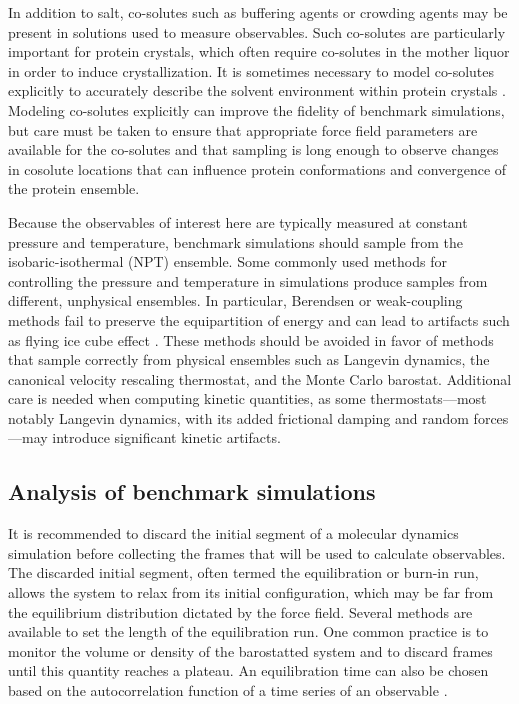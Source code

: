 \documentclass[9pt,review]{livecoms}
\begin{document}
In addition to salt, co-solutes such as buffering agents or crowding agents may be present in solutions used to measure observables.
Such co-solutes are particularly important for protein crystals, which often require co-solutes in the mother liquor in order to induce crystallization.
It is sometimes necessary to model co-solutes explicitly to accurately describe the solvent environment within protein crystals \cite{wall_biomolecular_2019}.
Modeling co-solutes explicitly can improve the fidelity of benchmark simulations, but care must be taken to ensure that appropriate force field parameters are available for the co-solutes and that sampling is long enough to observe changes in cosolute locations that can influence protein conformations and convergence of the protein ensemble.

Because the observables of interest here are typically measured at constant pressure and temperature, benchmark simulations should sample from the isobaric-isothermal (NPT) ensemble.
Some commonly used methods for controlling the pressure and temperature in simulations produce samples from different, unphysical ensembles.
In particular, Berendsen or weak-coupling methods fail to preserve the equipartition of energy and can lead to artifacts such as flying ice cube effect \cite{harvey_flying_1998,braun_anomalous_2018}.
These methods should be avoided in favor of methods that sample correctly from physical ensembles such as Langevin dynamics, the canonical velocity rescaling thermostat, and the Monte Carlo barostat.
Additional care is needed when computing kinetic quantities, as some thermostats---most notably Langevin dynamics, with its added frictional damping and random forces---may introduce significant kinetic artifacts.

\subsection{Analysis of benchmark simulations}
\label{sub:best_practices_analysis}

It is recommended to discard the initial segment of a molecular dynamics simulation before collecting the frames that will be used to calculate observables.
The discarded initial segment, often termed the equilibration or burn-in run, allows the system to relax from its initial configuration, which may be far from the equilibrium distribution dictated by the force field.
Several methods are available to set the length of the equilibration run. 
One common practice is to monitor the volume or density of the barostatted system and to discard frames until this quantity reaches a plateau.
An equilibration time can also be chosen based on the autocorrelation function of a time series of an observable \cite{chodera_simple_2016}.
\end{document}
